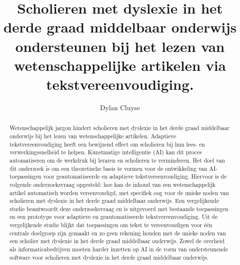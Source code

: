 \documentclass{hogent-article}
\title{Scholieren met dyslexie in het derde graad middelbaar onderwijs ondersteunen bij het lezen van wetenschappelijke artikelen via tekstvereenvoudiging.}
\author{Dylan Cluyse}
\begin{document}
	
\begin{abstract}
Wetenschappelijk jargon hindert scholieren met dyslexie in het derde graad middelbaar onderwijs bij het lezen van wetenschappelijke artikelen. Adaptieve tekstvereenvoudiging heeft een bewijzend effect om scholieren bij hun lees- en verwerkingssnelheid te helpen. Kunstmatige intelligentie (AI) kan dit proces automatiseren om de werkdruk bij leraren en scholieren te verminderen. Het doel van dit onderzoek is om een theoretische basis te vormen voor de ontwikkeling van AI-toepassingen voor geautomatiseerde en adaptieve tekstvereenvoudiging. Hiervoor is de volgende onderzoeksvraag opgesteld: hoe kan de inhoud van een wetenschappelijk artikel automatisch worden vereenvoudigd, met specifiek oog voor de unieke noden van scholieren met dyslexie in het derde graad middelbaar onderwijs. Een vergelijkende studie beantwoordt deze onderzoeksvraag en is uitgevoerd met bestaande toepassingen en een prototype voor adaptieve en geautomatiseerde tekstvereenvoudiging. Uit de vergelijkende studie blijkt dat toepassingen om tekst te vereenvoudigen voor één centrale doelgroep zijn gemaakt en zo geen rekening houden met de unieke noden van een scholier met dyslexie in het derde graad middelbaar onderwijs. Zowel de overheid als informaticabedrijven moeten harder inzetten op AI in de vorm van ondersteunende software voor scholieren met dyslexie in het derde graad middelbaar onderwijs.
\end{abstract}

\tableofcontents



\printbibliography[heading=bibintoc]
\end{document}
